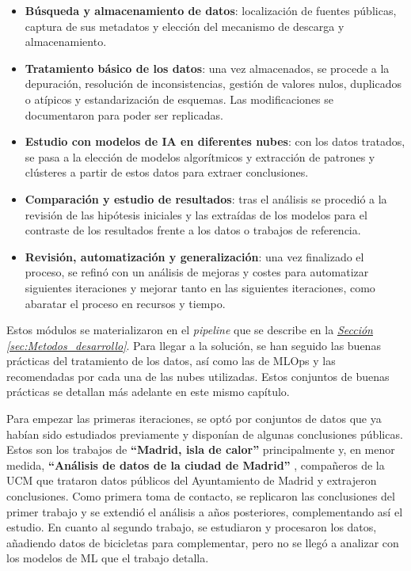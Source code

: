 \begin{itemize}
	\item \textbf{Búsqueda y almacenamiento de datos}: localización de fuentes públicas, captura de sus metadatos y elección del mecanismo de descarga y almacenamiento.
	\item \textbf{Tratamiento básico de los datos}: una vez almacenados, se procede a la depuración, resolución de inconsistencias, gestión de valores nulos, duplicados o atípicos y estandarización de esquemas. Las modificaciones se documentaron para poder ser replicadas.
	\item \textbf{Estudio con modelos de IA en diferentes nubes}: con los datos tratados, se pasa a la elección de modelos algorítmicos y extracción de patrones y clústeres a partir de estos datos para extraer conclusiones.
	\item \textbf{Comparación y estudio de resultados}: tras el análisis se procedió a la revisión de las hipótesis iniciales y las extraídas de los modelos para el contraste de los resultados frente a los datos o trabajos de referencia.
	\item \textbf{Revisión, automatización y generalización}: una vez finalizado el proceso, se refinó con un análisis de mejoras y costes para automatizar siguientes iteraciones y mejorar tanto en las siguientes iteraciones, como abaratar el proceso en recursos y tiempo.
\end{itemize}

Estos módulos se materializaron en el \textit{pipeline} que se describe en la \hyperref[sec:Metodos_desarrollo]{\textit{Sección \ref*{sec:Metodos_desarrollo}}}. Para llegar a la solución, se han seguido las buenas prácticas del tratamiento de los datos, así como las de MLOps y las recomendadas por cada una de las nubes utilizadas. Estos conjuntos de buenas prácticas se detallan más adelante en este mismo capítulo.

Para empezar las primeras iteraciones, se optó por conjuntos de datos que ya habían sido estudiados previamente y disponían de algunas conclusiones públicas. Estos son los trabajos de \textbf{``Madrid, isla de calor''} \citep{Meneses2023Madrid} principalmente y, en menor medida, \textbf{``Análisis de datos de la ciudad de Madrid''} \citep{SaizSantos2023}, compañeros de la UCM que trataron datos públicos del Ayuntamiento de Madrid y extrajeron conclusiones. Como primera toma de contacto, se replicaron las conclusiones del primer trabajo y se extendió el análisis a años posteriores, complementando así el estudio. En cuanto al segundo trabajo, se estudiaron y procesaron los datos, añadiendo datos de bicicletas para complementar, pero no se llegó a analizar con los modelos de ML que el trabajo detalla.

